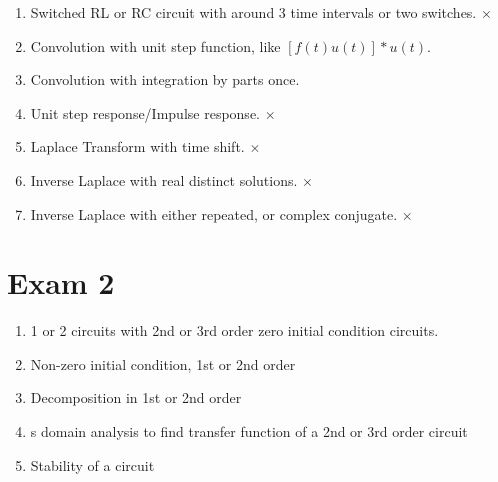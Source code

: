 \documentclass[nobib]{tufte-handout}
\begin{document}
\begin{enumerate}
    \item Switched RL or RC circuit with around 3 time intervals or two switches. $\times$
    \item Convolution with unit step function, like $[f(t)u(t)]*u(t)$. 
    \item Convolution with integration by parts once. 
    \item Unit step response/Impulse response. $\times$
    \item Laplace Transform with time shift. $\times$
    \item Inverse Laplace with real distinct solutions. $\times$
    \item Inverse Laplace with either repeated, or complex conjugate. $\times$
\end{enumerate}
\section{Exam 2}
\begin{enumerate}
    \item 1 or 2 circuits with 2nd or 3rd order zero initial condition circuits.
    \item Non-zero initial condition, 1st or 2nd order
    \item Decomposition in 1st or 2nd order
    \item s domain analysis to find transfer function of a 2nd or 3rd order circuit
    \item Stability of a circuit
\end{enumerate}
\end{document}
